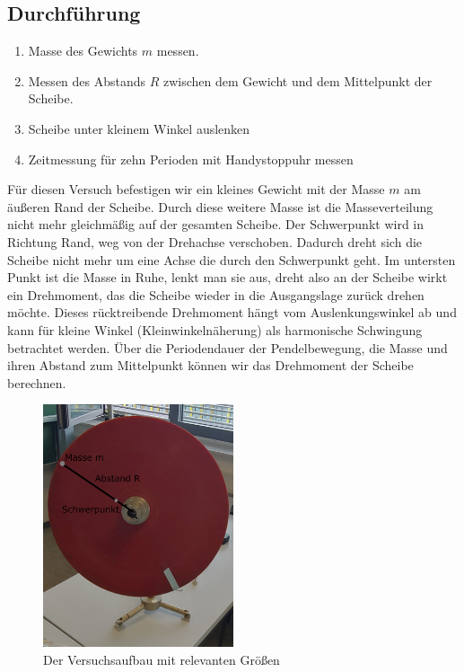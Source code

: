 \documentclass{article}
\begin{document}
		\subsection{Durchführung}
			\begin{enumerate}
				\item Masse des Gewichts \(m\) messen.
				\item Messen des Abstands \(R\) zwischen dem Gewicht und dem Mittelpunkt der Scheibe.
				\item Scheibe unter kleinem Winkel auslenken
				\item Zeitmessung für zehn Perioden mit Handystoppuhr messen
			\end{enumerate} %
			Für diesen Versuch befestigen wir ein kleines Gewicht mit der Masse \(m\) am äußeren Rand der Scheibe.
			Durch diese weitere Masse ist die Masseverteilung nicht mehr gleichmäßig auf der gesamten Scheibe. Der Schwerpunkt wird in Richtung Rand, weg von der Drehachse verschoben.
			Dadurch dreht sich die Scheibe nicht mehr um eine Achse die durch den Schwerpunkt geht.
			Im untersten Punkt ist die Masse in Ruhe, lenkt man sie aus, dreht also an der Scheibe wirkt ein Drehmoment, das die Scheibe wieder in die Ausgangslage zurück drehen möchte.
			Dieses rücktreibende Drehmoment hängt vom Auslenkungswinkel ab und kann für kleine Winkel (Kleinwinkelnäherung) als harmonische Schwingung betrachtet werden.
			Über die Periodendauer der Pendelbewegung, die Masse und ihren Abstand zum Mittelpunkt können wir das Drehmoment der Scheibe berechnen.

			\begin{figure}[!h]
				\centering
				\includegraphics[width=0.5\textwidth]{schwingung_aufbau.png}
				\caption{\label{fig:Schwingung_Aufbau}Der Versuchsaufbau mit relevanten Größen}
			\end{figure}
\end{document}
